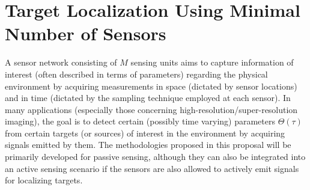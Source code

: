 \section{Target Localization Using Minimal Number of Sensors}
A sensor network consisting of $M$ sensing units aims to capture information of interest (often described in terms of parameters) regarding the physical environment by acquiring measurements in space (dictated by sensor locations) and in time (dictated by the sampling technique employed at each sensor). In many applications (especially those concerning high-resolution/super-resolution imaging), the goal is to detect certain (possibly time varying) parameters $\Theta(\tau)$ from certain targets (or sources) of interest in the environment by acquiring signals emitted by them. The methodologies proposed in this proposal will be primarily developed for passive sensing, although they can also be integrated into an active sensing scenario if the sensors are also allowed to actively emit signals for localizing targets.


